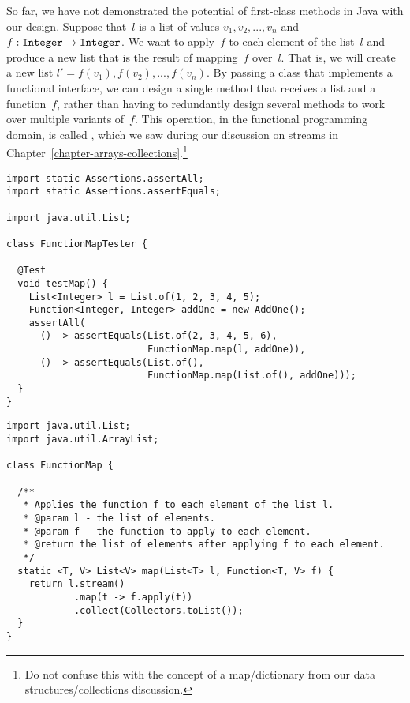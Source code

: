 So far, we have not demonstrated the potential of first-class methods in Java with our design. Suppose that~$l$ is a list of  values $v_1, v_2, ..., v_n$ and $f : \texttt{Integer} \to \texttt{Integer}$. 
We want to apply~$f$ to each element of the list~$l$ and produce a new list that is the result of mapping~$f$ over~$l$. 
That is, we will create a new list $l'=f(v_1), f(v_2), ..., f(v_n)$. 
By passing a class that implements a functional interface, we can design a single method that receives a list and a function~$f$, rather than having to redundantly design several methods to work over multiple variants of~$f$. 
This operation, in the functional programming domain, is called , which we saw during our discussion on streams in Chapter~\ref{chapter-arrays-collections}.\footnote{Do not confuse this with the concept of a map/dictionary from our data structures/collections discussion.}

\begin{lstlisting}[language=MyJava]
import static Assertions.assertAll;
import static Assertions.assertEquals;

import java.util.List;

class FunctionMapTester {

  @Test
  void testMap() {
    List<Integer> l = List.of(1, 2, 3, 4, 5);
    Function<Integer, Integer> addOne = new AddOne();
    assertAll(
      () -> assertEquals(List.of(2, 3, 4, 5, 6), 
                         FunctionMap.map(l, addOne)),
      () -> assertEquals(List.of(), 
                         FunctionMap.map(List.of(), addOne)));
  }
}
\end{lstlisting}

\begin{lstlisting}[language=MyJava]
import java.util.List;
import java.util.ArrayList;

class FunctionMap {

  /**
   * Applies the function f to each element of the list l.
   * @param l - the list of elements.
   * @param f - the function to apply to each element.
   * @return the list of elements after applying f to each element.
   */
  static <T, V> List<V> map(List<T> l, Function<T, V> f) {
    return l.stream()
            .map(t -> f.apply(t))
            .collect(Collectors.toList());
  }
}
\end{lstlisting}

